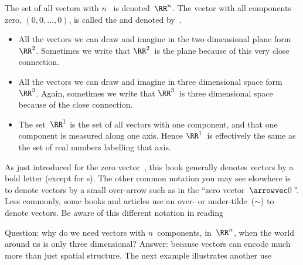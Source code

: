 \begin{definition} \label{def:rRn}
The set of all vectors with \(n\)~ is denoted~\(\RR^n\).
The vector with all components zero,  \((0,0,\ldots,0)\), is called the  and denoted by~\ov.
\end{definition}

\begin{example} 
\begin{itemize}
\item All the vectors we can draw and imagine in the two dimensional plane form~\(\RR^2\).  
Sometimes we write that \(\RR^2\)~is the plane because of this very close connection.

\item All the vectors we can draw and imagine in three dimensional space form~\(\RR^3\).  
Again, sometimes we write that \(\RR^3\)~is three dimensional space because of the close connection. 

\item The set~\(\RR^1\) is the set of all vectors with one component, and that one component is measured along one axis.  
Hence \(\RR^1\)~is effectively the same as the set of real numbers labelling that axis.
\aqed
\end{itemize}
\end{example}


As just introduced for the zero vector~\ov, this book generally denotes vectors by a bold letter (except for s).
The other common notation you may see elsewhere is to denote vectors by a small over-arrow such as in the ``zero vector~\(\arrowvec0\)\,''.
Less commonly, some books and articles use an over- or under-tilde~(\(\sim\)) to denote vectors.
Be aware of this different notation in reading 



Question: why do we need vectors with \(n\)~components, in~\(\RR^n\), when the world around us is only three dimensional?
Answer: because vectors can encode much more than just spatial structure.
The next example illustrates another use 


